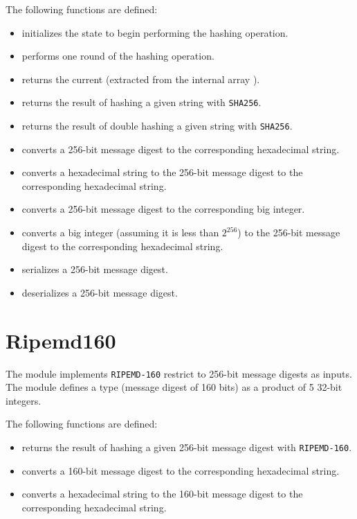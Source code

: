 The following functions are defined:

\begin{itemize}
\item {} initializes the state to begin performing the hashing operation.
\item {} performs one round of the hashing operation.
\item {} returns the current {} (extracted from the internal array {}).
\item {} returns the result of hashing a given string with {\tt{SHA256}}.
\item {} returns the result of double hashing a given string with {\tt{SHA256}}.
\item {} converts a 256-bit message digest to the corresponding hexadecimal string.
\item {} converts a hexadecimal string to the 256-bit message digest to the corresponding hexadecimal string.
\item {} converts a 256-bit message digest to the corresponding big integer.
\item {} converts a big integer (assuming it is less than $2^{256}$) to the 256-bit message digest to the corresponding hexadecimal string.
\item {} serializes a 256-bit message digest.
\item {} deserializes a 256-bit message digest.
\end{itemize}

\section{Ripemd160}

The module {} implements {\tt{RIPEMD-160}} restrict to 256-bit message digests as inputs.
The module defines a type {} (message digest of 160 bits)
as a product of 5 32-bit integers.

The following functions are defined:

\begin{itemize}
\item {} returns the result of hashing a given 256-bit message digest with {\tt{RIPEMD-160}}.
\item {} converts a 160-bit message digest to the corresponding hexadecimal string.
\item {} converts a hexadecimal string to the 160-bit message digest to the corresponding hexadecimal string.
\end{itemize}

